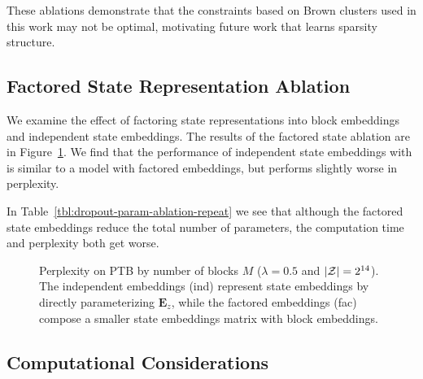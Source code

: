 \documentclass[11pt,a4paper]{article}
\begin{document}
These ablations demonstrate that the constraints based on
Brown clusters used in this work may not be optimal,
motivating future work that learns sparsity structure.

\subsection{Factored State Representation Ablation}
\label{sec:fac_ablation}
We examine the effect of factoring state representations into block embeddings
and independent state embeddings.
The results of the factored state ablation are in Figure~\ref{fig:fac-ablation}.
We find that the performance of independent state embeddings with
is similar to a model with factored embeddings,
but performs slightly worse in perplexity.

In Table~\ref{tbl:dropout-param-ablation-repeat} we see that although the factored state
embeddings reduce the total number of parameters,
the computation time and perplexity both get worse.

\begin{figure}[t]
\centering
{}
\caption{\label{fig:fac-ablation}
Perplexity on \textsc{PTB} by number of blocks $M$ ($\lambda =0.5$ and $|\mathcal{Z}|=2^{14}$).
The independent embeddings (ind) represent state embeddings by directly parameterizing $\mathbf{E}_z$, while the factored embeddings (fac) compose a smaller state embeddings matrix with block embeddings.
}
\end{figure}

\subsection{Computational Considerations}
\end{document}
